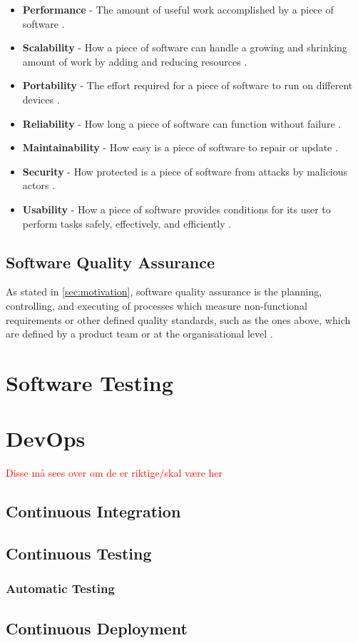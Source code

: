 \begin{itemize}
    \item \textbf{Performance} - The amount of useful work accomplished by a piece of software \cite{performance_wiki_2023}.
    \item \textbf{Scalability} - How a piece of software can handle a growing and shrinking amount of work by adding and reducing resources \cite{scalability_wiki_2023}. 
    \item \textbf{Portability} - The effort required for a piece of software to run on different devices \cite{portability_wiki_2023}.
    \item \textbf{Reliability} - How long a piece of software can function without failure \cite{reliability_wiki_2023}.
    \item \textbf{Maintainability} - How easy is a piece of software to repair or update \cite{maintainability_wiki_2023}. 
    \item \textbf{Security} - How protected is a piece of software from attacks by malicious actors \cite{security_wiki_2023}.
    \item \textbf{Usability} - How a piece of software provides conditions for its user to perform tasks safely, effectively, and efficiently \cite{usability_wiki_2023}.
\end{itemize}

\subsection{Software Quality Assurance}
As stated in \autoref{sec:motivation}, software quality assurance is the planning, controlling, and executing of processes which measure non-functional requirements or other defined quality standards, such as the ones above, which are defined by a product team or at the organisational level \cite{ieee_730_2014}\cite{sqa_wiki_2023}.

\section{Software Testing}

\section{DevOps}

\textcolor{red}{Disse må sees over om de er riktige/skal være her}
\subsection{Continuous Integration}

\subsection{Continuous Testing}

\subsubsection{Automatic Testing}


\subsection{Continuous Deployment}